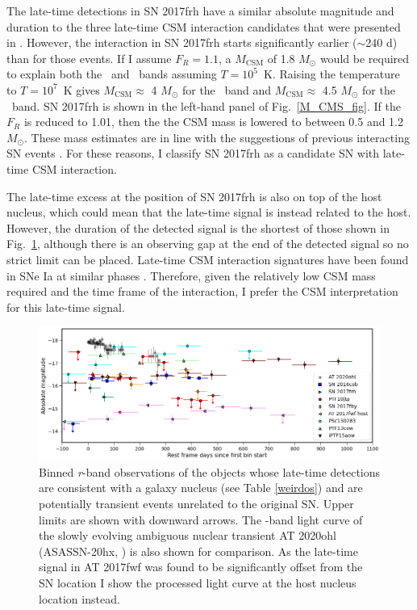 \documentclass[a4paper,oneside,12pt, class=Latex/Classes/PhDthesisPSnPDF, crop=false]{standalone}
\begin{document}
The late-time detections in SN 2017frh have a similar absolute magnitude and duration to the three late-time CSM interaction candidates that were presented in \citet{Terwel_2024_paper1}. However, the interaction in SN 2017frh starts significantly earlier ($\sim$240 d) than for those events. If I assume $F_R = 1.1$, a $M_\text{CSM}$ of 1.8 $M_\odot$ would be required to explain both the \ztfg\ and \ztfr\ bands assuming $T=10^5$~K. Raising the temperature to $T=10^7$~K gives $M_\text{CSM}\approx$ 4 $M_\odot$ for the \ztfg\ band and $M_\text{CSM}\approx$ 4.5 $M_\odot$ for the \ztfr\ band. SN 2017frh is shown in the left-hand panel of Fig.~\ref{M_CMS_fig}. If the $F_R$ is reduced to 1.01, then the the CSM mass is lowered to between 0.5 and 1.2 $M_\odot$. These mass estimates are in line with the suggestions of previous interacting SN events \citep{ptf11kx, Inserra_2016}. For these reasons, I classify SN 2017frh as a candidate SN with late-time CSM interaction.

The late-time excess at the position of SN 2017frh is also on top of the host nucleus, which could mean that the late-time signal is instead related to the host. However, the duration of the detected signal is the shortest of those shown in Fig.~\ref{ANT_comp}, although there is an observing gap at the end of the detected signal so no strict limit can be placed. Late-time CSM interaction signatures have been found in SNe Ia at similar phases \citep{2015cp}. Therefore, given the relatively low CSM mass required and the time frame of the interaction, I prefer the CSM interpretation for this late-time signal.\\

\begin{figure}
    \centering
    \includegraphics[width=\textwidth]{../Images/chapter_4/ANT_comp.png}
    \caption{Binned \textit{r}-band observations of the objects whose late-time detections are consistent with a galaxy nucleus (see Table \ref{weirdos}) and are potentially transient events unrelated to the original SN. Upper limits are shown with downward arrows. The \ztfr-band light curve of the slowly evolving ambiguous nuclear transient AT 2020ohl (ASASSN-20hx, \citealt{2020ohl_Hinkle}) is also shown for comparison. As the late-time signal in AT 2017fwf was found to be significantly offset from the SN location I show the processed light curve at the host nucleus location instead.}
    \label{ANT_comp}
\end{figure}
\end{document}
